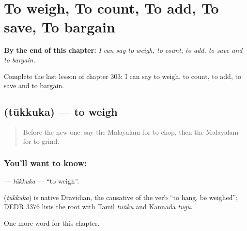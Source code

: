 
\chapter{To weigh, To count, To add, To save, To bargain}
\label{ch:ml-to-weigh-to-count-to-add-to-save-to-bargain}

\begin{chapteropening}
\textbf{By the end of this chapter:} \emph{I can say to weigh, to count, to add, to save and to bargain.}

Complete the last lesson of chapter 303: I can say to weigh, to count, to add, to save and to bargain.
\end{chapteropening}

\section[\texorpdfstring{\ml{തൂക്കുക} (tūkkuka)}{തൂക്കുക (tūkkuka)}]{ (tūkkuka) — to weigh}

\label{lesson:ML-C303-tukkuka}



\begin{quote}
Before the new one: say the Malayalam for to chop, then the Malayalam for to grind.
\end{quote}

\subsection*{You'll want to know: }
\textbf{} — \emph{tūkkuka} — \textquotedblleft{}to weigh\textquotedblright{}.

\begin{cousinweb}
\textbf{} (\emph{tūkkuka}) is native Dravidian, the causative of the verb \textquotedblleft{}to hang, be weighed\textquotedblright{}; DEDR 3376 lists the root with Tamil \emph{tūṅku} and Kannada \emph{tūgu}.
\end{cousinweb}

\begin{grammarlens}[title={What you've built}]
One more word for this chapter.
\end{grammarlens}

